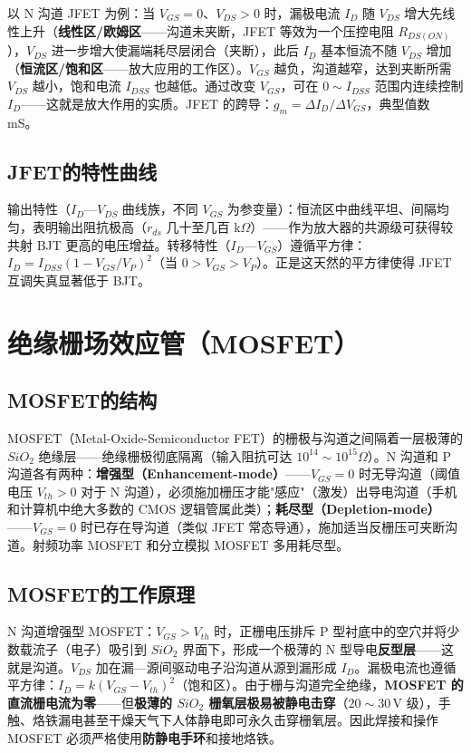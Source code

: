 \documentclass[12pt,UTF8]{ctexbook}
\begin{document}
以 N 沟道 JFET 为例：当 $V_{GS}=0$、$V_{DS}>0$ 时，漏极电流 $I_D$ 随 $V_{DS}$ 增大先线性上升（\textbf{线性区/欧姆区}——沟道未夹断，JFET 等效为一个压控电阻 $R_{DS(ON)}$），$V_{DS}$ 进一步增大使漏端耗尽层闭合（夹断），此后 $I_D$ 基本恒流不随 $V_{DS}$ 增加（\textbf{恒流区/饱和区}——放大应用的工作区）。$V_{GS}$ 越负，沟道越窄，达到夹断所需 $V_{DS}$ 越小，饱和电流 $I_{DSS}$ 也越低。通过改变 $V_{GS}$，可在 $0\sim I_{DSS}$ 范围内连续控制 $I_D$——这就是放大作用的实质。JFET 的跨导：$g_m = \Delta I_D/\Delta V_{GS}$，典型值数 mS。

\subsection{JFET的特性曲线}

输出特性（$I_D$—$V_{DS}$ 曲线族，不同 $V_{GS}$ 为参变量）：恒流区中曲线平坦、间隔均匀，表明输出阻抗极高（$r_{ds}$ 几十至几百 k$\Omega$）——作为放大器的共源级可获得较共射 BJT 更高的电压增益。转移特性（$I_D$—$V_{GS}$）遵循平方律：$I_D = I_{DSS}(1 - V_{GS}/V_P)^2$（当 $0 > V_{GS} > V_P$）。正是这天然的平方律使得 JFET 互调失真显著低于 BJT。

\section{绝缘栅场效应管（MOSFET）}
\label{sec:mosfet}

\subsection{MOSFET的结构}

MOSFET（Metal-Oxide-Semiconductor FET）的栅极与沟道之间隔着一层极薄的 $SiO_2$ 绝缘层——绝缘栅极彻底隔离（输入阻抗可达 $10^{14}\sim10^{15}\Omega$）。N 沟道和 P 沟道各有两种：\textbf{增强型（Enhancement-mode）}——$V_{GS}=0$ 时无导沟道（阈值电压 $V_{th}>0$ 对于 N 沟道），必须施加栅压才能"感应"（激发）出导电沟道（手机和计算机中绝大多数的 CMOS 逻辑管属此类）；\textbf{耗尽型（Depletion-mode）}——$V_{GS}=0$ 时已存在导沟道（类似 JFET 常态导通），施加适当反栅压可夹断沟道。射频功率 MOSFET 和分立模拟 MOSFET 多用耗尽型。

\subsection{MOSFET的工作原理}

N 沟道增强型 MOSFET：$V_{GS}>V_{th}$ 时，正栅电压排斥 P 型衬底中的空穴并将少数载流子（电子）吸引到 $SiO_2$ 界面下，形成一个极薄的 N 型导电\textbf{反型层}——这就是沟道。$V_{DS}$ 加在漏—源间驱动电子沿沟道从源到漏形成 $I_D$。漏极电流也遵循平方律：$I_D = k(V_{GS}-V_{th})^2$（饱和区）。由于栅与沟道完全绝缘，\textbf{MOSFET 的直流栅电流为零}——但\textbf{极薄的 $SiO_2$ 栅氧层极易被静电击穿}（$20\sim30\,\mathrm{V}$ 级），手触、烙铁漏电甚至干燥天气下人体静电即可永久击穿栅氧层。因此焊接和操作 MOSFET 必须严格使用\textbf{防静电手环}和接地烙铁。
\end{document}
